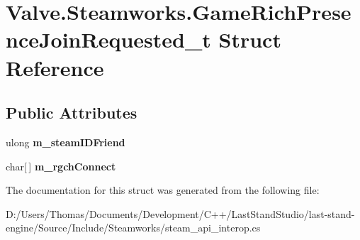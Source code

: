 \hypertarget{structValve_1_1Steamworks_1_1GameRichPresenceJoinRequested__t}{}\section{Valve.\+Steamworks.\+Game\+Rich\+Presence\+Join\+Requested\+\_\+t Struct Reference}
\label{structValve_1_1Steamworks_1_1GameRichPresenceJoinRequested__t}
\subsection*{Public Attributes}
\begin{DoxyCompactItemize}
\item 
\hypertarget{structValve_1_1Steamworks_1_1GameRichPresenceJoinRequested__t_a5166deca1915c29bab44603367ee31fe}{}ulong {\bfseries m\+\_\+steam\+I\+D\+Friend}\label{structValve_1_1Steamworks_1_1GameRichPresenceJoinRequested__t_a5166deca1915c29bab44603367ee31fe}

\item 
\hypertarget{structValve_1_1Steamworks_1_1GameRichPresenceJoinRequested__t_af966308f99f4ef56891172384ef89e96}{}char\mbox{[}$\,$\mbox{]} {\bfseries m\+\_\+rgch\+Connect}\label{structValve_1_1Steamworks_1_1GameRichPresenceJoinRequested__t_af966308f99f4ef56891172384ef89e96}

\end{DoxyCompactItemize}


The documentation for this struct was generated from the following file\+:\begin{DoxyCompactItemize}
\item 
D\+:/\+Users/\+Thomas/\+Documents/\+Development/\+C++/\+Last\+Stand\+Studio/last-\/stand-\/engine/\+Source/\+Include/\+Steamworks/steam\+\_\+api\+\_\+interop.\+cs\end{DoxyCompactItemize}
